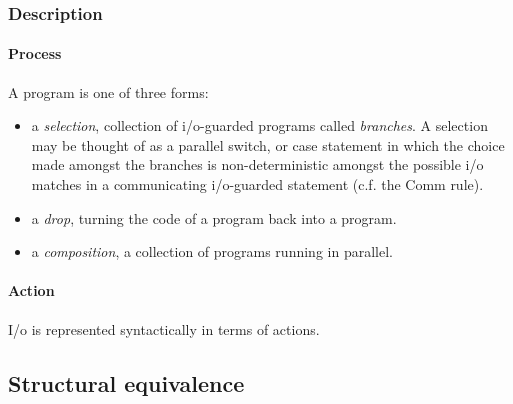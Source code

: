 \newpage

\subsubsection{Description}

\paragraph{Process} A program is one of three forms:

\begin{itemize}
\item a \emph{selection}, collection of i/o-guarded programs called
  \emph{branches}. A selection may be thought of as a parallel switch,
  or case statement in which the choice made amongst the branches is
  non-deterministic amongst the possible i/o matches in a
  communicating i/o-guarded statement (c.f. the Comm rule).
\item a \emph{drop}, turning the code of a program back into a program.
\item a \emph{composition}, a collection of programs running in
  parallel.
\end{itemize}

\paragraph{Action} I/o is represented syntactically in terms of actions.

\subsection{Structural equivalence}






